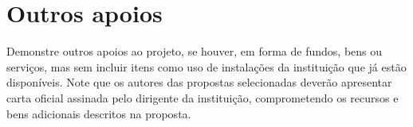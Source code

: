 \chapter{Outros apoios}\label{chp:outrosApoios}
Demonstre outros apoios ao projeto, se houver, em forma de fundos, bens ou serviços, mas sem incluir itens como uso de instalações da instituição que já estão disponíveis. Note que os autores das propostas selecionadas deverão apresentar carta oficial assinada pelo dirigente da instituição, comprometendo os recursos e bens adicionais descritos na proposta.